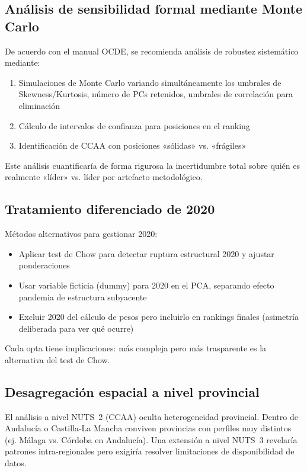 \subsection{Análisis de sensibilidad formal mediante Monte Carlo}

De acuerdo con el manual OCDE, se recomienda análisis de robustez sistemático mediante:
\begin{enumerate}
    \item Simulaciones de Monte Carlo variando simultáneamente los umbrales de Skewness/Kurtosis, número de PCs retenidos, umbrales de correlación para eliminación
    \item Cálculo de intervalos de confianza para posiciones en el ranking
    \item Identificación de CCAA con posiciones «sólidas» vs. «frágiles»
\end{enumerate}

Este análisis cuantificaría de forma rigurosa la incertidumbre total sobre quién es realmente «líder» vs. líder por artefacto metodológico.

\subsection{Tratamiento diferenciado de 2020}

Métodos alternativos para gestionar 2020:
\begin{itemize}
    \item Aplicar test de Chow para detectar ruptura estructural 2020 y ajustar ponderaciones
    \item Usar variable ficticia (dummy) para 2020 en el PCA, separando efecto pandemia de estructura subyacente
    \item Excluir 2020 del cálculo de pesos pero incluirlo en rankings finales (asimetría deliberada para ver qué ocurre)
\end{itemize}

Cada opta tiene implicaciones: más compleja pero más trasparente es la alternativa del test de Chow.

\subsection{Desagregación espacial a nivel provincial}

El análisis a nivel NUTS~2 (CCAA) oculta heterogeneidad provincial. Dentro de Andalucía o Castilla-La Mancha conviven provincias con perfiles muy distintos (ej. Málaga vs. Córdoba en Andalucía). Una extensión a nivel NUTS~3 revelaría patrones intra-regionales pero exigiría resolver limitaciones de disponibilidad de datos.

